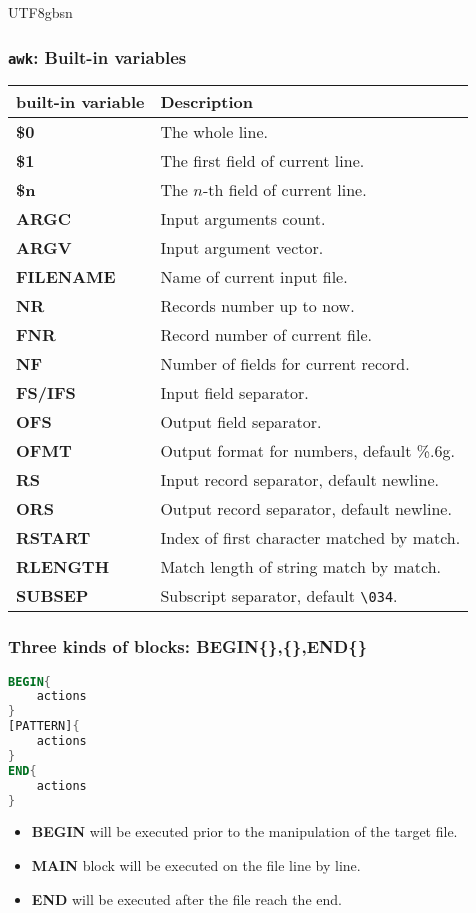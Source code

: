 \documentclass[red]{beamer}
\newcommand*{\lstverb}{\lstinline[style=caret]}
\begin{document}
\begin{CJK*}{UTF8}{gbsn}
\begin{frame}
\frametitle{\texttt{awk}: Built-in variables}
\begin{table}[ht]
\footnotesize
\begin{tabular}{ll}
\hline
\textbf{built-in variable} & \textbf{Description}\\
\hline
\textbf{\$0} & The whole line.\\
\textbf{\$1} & The first field of current line.\\
\textbf{\$n} & The $n$-th field of current line.\\
\textbf{ARGC} & Input arguments count.\\
\textbf{ARGV} & Input argument vector.\\
\textbf{FILENAME} & Name of current input file.\\
\textbf{NR} & Records number up to now.\\
\textbf{FNR} & Record number of current file.\\
\textbf{NF} & Number of fields for current record.\\
\textbf{FS/IFS} & Input field separator.\\
\textbf{OFS} & Output field separator.\\
\textbf{OFMT} & Output format for numbers, default \%.6g.\\
\textbf{RS} & Input record separator, default newline.\\
\textbf{ORS} & Output record separator, default newline.\\
\textbf{RSTART} & Index of first character matched by match.\\
\textbf{RLENGTH} & Match length of string match by match.\\
\textbf{SUBSEP} & Subscript separator, default \lstverb|\034|.\\
\hline
\end{tabular}
\end{table}
\end{frame}


\begin{frame}
\frametitle{Three kinds of blocks: BEGIN\{\},\{\},END\{\}}
\begin{lstlisting}[language=awk,format=awk]
BEGIN{
	actions
}
[PATTERN]{
	actions
}
END{
	actions
}
\end{lstlisting}
\begin{itemize}
\footnotesize
	\item \textbf{BEGIN} will be executed prior to the 
		manipulation of the target file.
	\item \textbf{MAIN} block will be executed on the 
		file line by line.
	\item \textbf{END} will be executed after the file 
		reach the end.  
\end{itemize}
\end{frame}



\end{CJK*}
\end{document}
